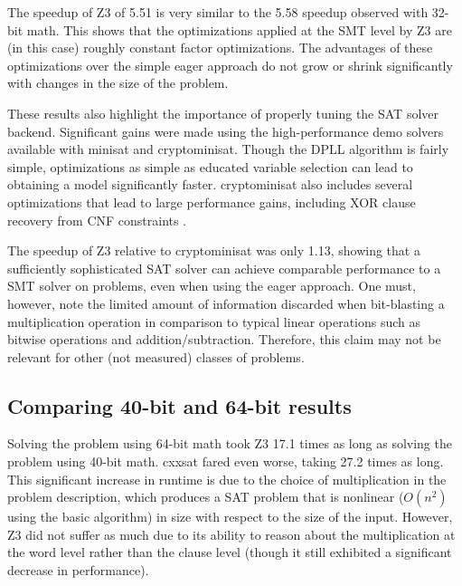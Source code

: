 \documentclass{sig-alternate}
\begin{document}
The speedup of Z3 of 5.51 is very similar to the 5.58 speedup observed with
32-bit math.  This shows that the optimizations applied at the SMT level by
Z3 are (in this case) roughly constant factor optimizations.  The advantages
of these optimizations over the simple eager approach do not grow or shrink
significantly with changes in the size of the problem.

These results also highlight the importance of properly tuning the SAT solver
backend.  Significant gains were made using the high-performance demo solvers
available with minisat and cryptominisat.  Though the DPLL algorithm is
fairly simple, optimizations as simple as educated variable selection can lead
to obtaining a model significantly faster.  cryptominisat also includes several
optimizations that lead to large performance gains, including XOR clause
recovery from CNF constraints \cite{soos}.

The speedup of Z3 relative to cryptominisat was only 1.13, showing that
a sufficiently sophisticated SAT solver can achieve comparable performance
to a SMT solver on problems, even when using the eager approach.  One must,
however, note the limited amount of information discarded when bit-blasting
a multiplication operation in comparison to typical linear operations such
as bitwise operations and addition/subtraction.  Therefore, this claim may
not be relevant for other (not measured) classes of problems.

\subsection{Comparing 40-bit and 64-bit results}

Solving the problem using 64-bit math took Z3 17.1 times as long as solving
the problem using 40-bit math.  cxxsat fared even worse, taking 27.2 times
as long.  This significant increase in runtime is due to the choice of
multiplication in the problem description, which produces a SAT problem that
is nonlinear ($O(n^2)$ using the basic algorithm) in size with respect to the
size of the input.  However, Z3 did not suffer as much due to its ability to
reason about the multiplication at the word level rather than the clause
level (though it still exhibited a significant decrease in performance).
\end{document}
